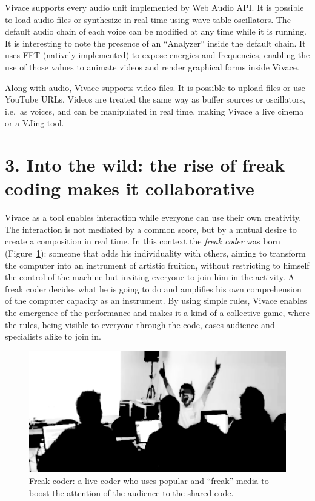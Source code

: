 \documentclass[12pt,times,twocolumn]{article}
\begin{document}
Vivace supports every audio unit implemented by Web Audio API. It is
possible to load audio files or synthesize in real time using
wave-table oscillators. The default audio chain of each voice can be
modified at any time while it is running. It is interesting to note
the presence of an ``Analyzer'' inside the default chain. It uses FFT
(natively implemented) to expose energies and frequencies, enabling
the use of those values to animate videos and render graphical forms
inside Vivace.

Along with audio, Vivace supports video files. It is possible to
upload files or use YouTube URLs. Videos are treated the same way as
buffer sources or oscillators, i.e.\ as voices, and can be manipulated
in real time, making Vivace a live cinema or a VJing tool.

\section{3. Into the wild: the rise of freak coding makes it collaborative}
Vivace as a tool enables interaction while everyone can use their
own creativity. The interaction is not mediated by a common score, but
by a mutual desire to create a composition in real time. In this
context the \emph{freak coder} was born (Figure~\ref{fig:freakcoder}):
someone that adds his individuality with others, aiming to transform
the computer into an instrument of artistic fruition, without
restricting to himself the control of the machine but inviting
everyone to join him in the activity. A freak coder decides what
he is going to do and amplifies his own comprehension of the computer
capacity as an instrument. By using simple rules, Vivace enables the
emergence of the performance and makes it a kind of a collective game,
where the rules, being visible to everyone through the code, eases audience and
specialists alike to join in.

\begin{figure}[htpb]
  \begin{center}
    \includegraphics[scale=.2]{img/fig_freakcoder_.png}
    \caption{Freak coder: a live coder who uses
      popular and ``freak'' media to boost the attention of the audience to the shared
      code.}
    \label{fig:freakcoder}
  \end{center}
\end{figure}
\end{document}
